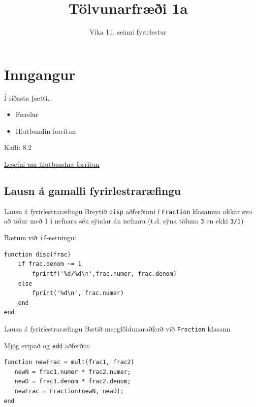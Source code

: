 \documentclass{beamer}
\title{Tölvunarfræði 1a}
\subtitle{Vika 11, seinni fyrirlestur}
\begin{document}
\begin{frame}
\titlepage
\end{frame}

\section{Inngangur}

\begin{frame}{Í síðasta þætti\ldots}
\begin{itemize}
 \item Færslur
 \item Hlutbundin forritun
\end{itemize}
Kafli: 8.2

\href{http://www.ce.berkeley.edu/~sanjay/e7/oop.pdf}{Lesefni um hlutbundna forritun}
\end{frame}

\subsection{Lausn á gamalli fyrirlestraræfingu}

\begin{frame}[fragile]{Lausn á fyrirlestraræfingu}
\vspace{\baselineskip}
Breytið \texttt{disp} aðferðinni í \texttt{Fraction} klasanum okkar svo að tölur með 1 í nefnara séu sýndar án nefnara (t.d. sýna töluna \texttt{3} en ekki \texttt{3/1})
\pause

Bætum við \texttt{if}-setningu:
\begin{verbatim}
function disp(frac)
    if frac.denom ~= 1
        fprintf('%d/%d\n',frac.numer, frac.denom)
    else
        fprint('%d\n', frac.numer)
    end
end
\end{verbatim}

\end{frame}

\begin{frame}[fragile]{Lausn á fyrirlestraræfingu}
\vspace{\baselineskip}
Bætið margföldunaraðferð við \texttt{Fraction} klasann
\pause

Mjög svipað og \texttt{add} aðferðin:
\begin{verbatim}
function newFrac = mult(frac1, frac2)
   newN = frac1.numer * frac2.numer;
   newD = frac1.denom * frac2.denom;
   newFrac = Fraction(newN, newD);
end
\end{verbatim}

\end{frame}
\end{document}
